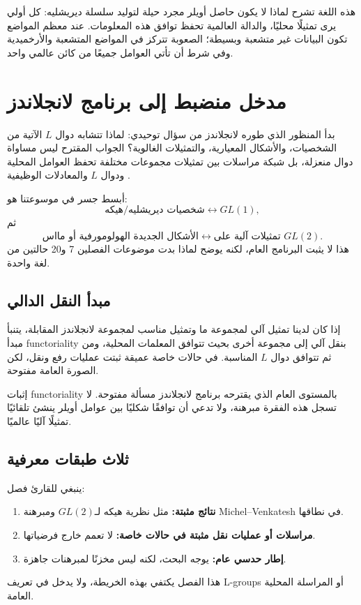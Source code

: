 هذه اللغة تشرح لماذا لا يكون حاصل أويلر مجرد حيلة لتوليد سلسلة
ديريشليه: كل أولي يرى تمثيلًا محليًا، والدالة العالمية تحفظ توافق هذه
المعلومات. عند معظم المواضع تكون البيانات غير متشعبة وبسيطة؛ الصعوبة
تتركز في المواضع المتشعبة والأرخميدية وفي شرط أن تأتي العوامل جميعًا
من كائن عالمي واحد.

\section{مدخل منضبط إلى برنامج لانجلاندز}

بدأ المنظور الذي طوره لانجلاندز من سؤال توحيدي: لماذا تتشابه دوال
\(L\) الآتية من الشخصيات، والأشكال المعيارية، والتمثيلات الغالوية؟
الجواب المقترح ليس مساواة دوال منعزلة، بل شبكة مراسلات بين تمثيلات
مجموعات مختلفة تحفظ العوامل المحلية ودوال \(L\) والمعادلات الوظيفية
\cite{LanglandsProblems1970,LanglandsEulerProducts1971}.

أبسط جسر في موسوعتنا هو:
\[
\text{شخصيات ديريشليه/هيكه}
\longleftrightarrow
GL(1),
\]
ثم
\[
\text{الأشكال الجديدة الهولومورفية أو مااس}
\longleftrightarrow
\text{تمثيلات آلية على }GL(2).
\]
هذا لا يثبت البرنامج العام، لكنه يوضح لماذا بدت موضوعات الفصلين 7 و20
حالتين من لغة واحدة.

\subsection*{مبدأ النقل الدالي}

إذا كان لدينا تمثيل آلي لمجموعة ما وتمثيل مناسب لمجموعة لانجلاندز
المقابلة، يتنبأ مبدأ \textenglish{functoriality} بنقل آلي إلى مجموعة
أخرى بحيث تتوافق المعلمات المحلية، ومن ثم تتوافق دوال \(L\) المناسبة.
في حالات خاصة عميقة ثبتت عمليات رفع ونقل، لكن الصورة العامة مفتوحة.

\begin{remark}
\label{open:ch21-general-functoriality}
إثبات \textenglish{functoriality} بالمستوى العام الذي يقترحه برنامج
لانجلاندز مسألة مفتوحة. لا تسجل هذه الفقرة مبرهنة، ولا تدعي أن توافقًا
شكليًا بين عوامل أويلر ينشئ تلقائيًا تمثيلًا آليًا عالميًا.
\end{remark}

\subsection*{ثلاث طبقات معرفية}

ينبغي للقارئ فصل:
\begin{enumerate}
  \item \textbf{نتائج مثبتة:} مثل نظرية هيكه لـ\(GL(2)\) ومبرهنة
  Michel--Venkatesh في نطاقها.
  \item \textbf{مراسلات أو عمليات نقل مثبتة في حالات خاصة:} لا تعمم
  خارج فرضياتها.
  \item \textbf{إطار حدسي عام:} يوجه البحث، لكنه ليس مخزنًا لمبرهنات
  جاهزة.
\end{enumerate}
هذا الفصل يكتفي بهذه الخريطة، ولا يدخل في تعريف \textenglish{L-groups} أو
المراسلة المحلية العامة.

